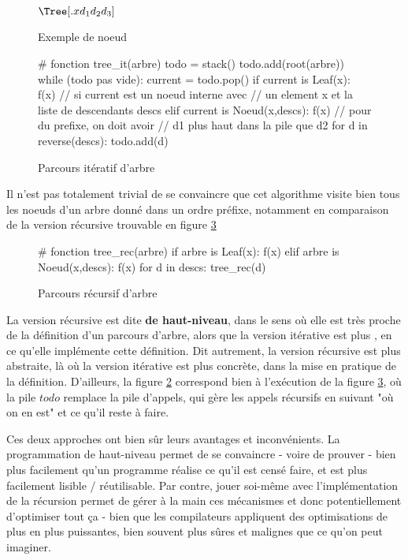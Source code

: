 \begin{figure}[!ht]
\centering
$\Tree[.x d_1 d_2 d_3 ]$
\caption{Exemple de noeud}
\label{simparbre}
\end{figure}

\begin{figure}[!ht]
\begin{python}
# fonction tree_it(arbre)
todo = stack()
todo.add(root(arbre))
while (todo pas vide):
    current = todo.pop()
    if current is Leaf(x):
        f(x)
    // si current est un noeud interne avec 
    // un element x et la liste de descendants descs
    elif current is Noeud(x,descs):
        f(x)
        // pour du prefixe, on doit avoir
        // d1 plus haut dans la pile que d2
        for d in reverse(descs):
             todo.add(d)

\end{python}
\caption{Parcours itératif d'arbre}
\label{treeit}
\end{figure}

Il n'est pas totalement trivial de se convaincre que cet algorithme visite bien tous les noeuds d'un arbre donné dans un ordre préfixe, notamment en comparaison de la version récursive trouvable en figure \ref{treerec}

\begin{figure}[!ht]
\begin{python}
# fonction tree_rec(arbre)
if arbre is Leaf(x):
    f(x)
elif arbre is Noeud(x,descs):
    f(x)
    for d in descs:
        tree_rec(d)
\end{python}
\caption{Parcours récursif d'arbre}
\label{treerec}
\end{figure}

La version récursive est dite \textbf{de haut-niveau}, dans le sens où elle est très proche de la définition d'un parcours d'arbre, alors que la version itérative est plus , en ce qu'elle implémente cette définition. Dit autrement, la version récursive est plus abstraite, là où la version itérative est plus concrète, dans la mise en pratique de la définition. D'ailleurs, la figure \ref{treeit} correspond bien à l'exécution de la figure \ref{treerec}, où la pile $todo$ remplace la pile d'appels, qui gère les appels récursifs en suivant "où on en est" et ce qu'il reste à faire.

Ces deux approches ont bien sûr leurs avantages et inconvénients. La programmation de haut-niveau permet de se convaincre - voire de prouver - bien plus facilement qu'un programme réalise ce qu'il est censé faire, et est plus facilement lisible / réutilisable. Par contre, jouer soi-même avec l'implémentation de la récursion permet de gérer à la main ces mécanismes et donc potentiellement d'optimiser tout ça - bien que les compilateurs appliquent des optimisations de plus en plus puissantes, bien souvent plus sûres et malignes que ce qu'on peut imaginer. 
